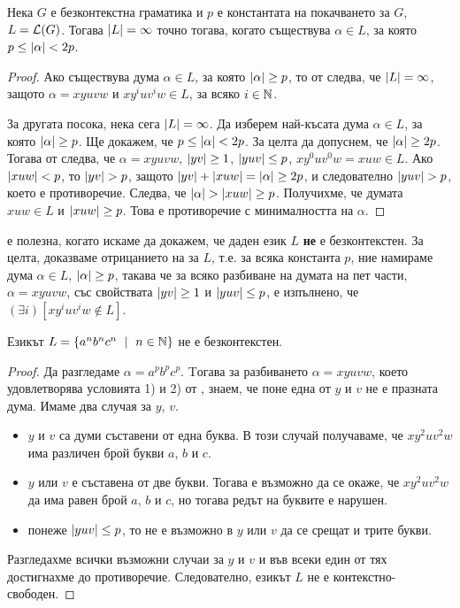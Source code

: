 \begin{cor}
  Нека $G$ е безконтекстна граматика и $p$ е константата на покачването за $G$, $L = \mathcal{L}(G)$.
  Тогава $\lvert{L}\rvert = \infty$ точно тогава, когато съществува $\alpha \in L$, за която $p \leq \lvert{\alpha}\rvert < 2p$.
\end{cor}
\begin{proof}
  Ако съществува дума $\alpha \in L$, за която $\lvert{\alpha}\rvert \geq p$, то от  следва,
  че $\lvert{L}\rvert = \infty$, защото $\alpha = xyuvw$ и $xy^iuv^iw \in L$, за всяко $i\in\mathbb{N}$.

  За другата посока, нека сега $\lvert{L}\rvert = \infty$.
  Да изберем най-късата дума $\alpha \in L$, за която $\lvert{\alpha}\rvert \geq p$.
  Ще докажем, че $p \leq \lvert{\alpha}\rvert < 2p$. За целта да допуснем, че $\lvert{\alpha}\rvert \geq 2p$.
  Тогава от  следва, че $\alpha = xyuvw$, $\lvert{yv}\rvert \geq 1$, $\lvert{yuv}\rvert \leq p$, $xy^0uv^0w = xuw \in L$.
  Ако $\lvert{xuw}\rvert < p$, то $\lvert{yv}\rvert > p$, защото $\lvert{yv}\rvert + \lvert{xuw}\rvert = \lvert{\alpha}\rvert \geq 2p$, и следователно $\lvert{yuv}\rvert > p$, което е противоречие.
  Следва, че $\lvert{\alpha}\rvert > \lvert{xuw}\rvert \geq p$.
  Получихме, че думата $xuw\in L$ и $\lvert{xuw}\rvert \geq p$. Това е противоречие с минималността на $\alpha$.
\end{proof}

\begin{framed}
   е полезна, когато искаме да докажем, че даден език $L$ {\bf не} е безконтекстен.
  За целта, доказваме отрицанието на  за $L$, т.е.
  за всяка константа $p$, ние намираме дума $\alpha \in L$, $\lvert{\alpha}\rvert\geq p$, такава че за всяко разбиване на думата на пет части, $\alpha = xyuvw$,
  със свойствата $\lvert{yv}\rvert \geq 1$ и $\lvert{yuv}\rvert \leq p$, е изпълнено, че $(\exists i)[xy^iuv^iw \not\in L]$.
\end{framed}

\begin{example}
  \label{example:anbncn}
  Езикът $L = \{a^nb^nc^n\ \mid\ n\in\mathbb{N}\}$ не е безконтекстен.
\end{example}
\begin{proof}
  Да разгледаме $\alpha = a^pb^pc^p$.
  Tогава за разбиването $\alpha = xyuvw$, което удовлетворява условията 1) и 2) от ,
  знаем, че поне една от $y$ и $v$ не е празната дума.
  Имаме два случая за $y$, $v$.
  \begin{itemize}
  \item
    $y$ и $v$ са думи съставени от една буква.
    В този случай получаваме, че $xy^2uv^2w$ има различен брой букви $a$, $b$ и $c$.
  \item
    $y$ или $v$ е съставена от две букви.
    Тогава е възможно да се окаже, че $xy^2uv^2w$ да има равен брой $a$, $b$ и $c$,
    но тогава редът на буквите е нарушен.
  \item
    понеже $\lvert{yuv}\rvert \leq p$, то не е възможно в $y$ или $v$ да се срещат и трите букви.
  \end{itemize}  
  Разгледахме всички възможни случаи за $y$ и $v$ и във всеки един от тях достигнахме до противоречие.
  Следователно, езикът $L$ не е контекстно-свободен.
\end{proof}

